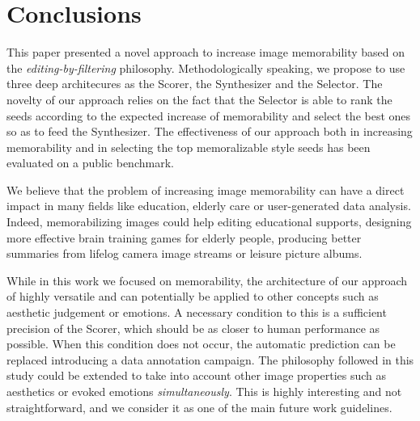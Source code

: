 \documentclass{sig-alternate-05-2015}
\begin{document}
\section{Conclusions}
This paper presented a novel approach to increase image memorability based on the \emph{editing-by-filtering} philosophy. Methodologically speaking, we propose to use three deep architecures as the Scorer, the Synthesizer and the Selector. The novelty of our approach relies on the fact that the Selector is able to rank the seeds according to the expected increase of memorability and select the best ones so as to feed the Synthesizer. The effectiveness of our approach both in increasing memorability and in selecting the top memoralizable style seeds has been evaluated on a public benchmark. %



We believe that the problem of increasing image memorability can have a direct impact in many fields like education, elderly care or user-generated data analysis. Indeed,   memorabilizing images could help editing educational supports, designing more effective brain training games for elderly people, producing better summaries from lifelog camera image streams or leisure picture albums.

While in this work we focused on memorability, the architecture of our approach of highly versatile %
and can potentially be applied to other concepts such as aesthetic judgement or emotions. A necessary condition to this is a sufficient precision of the Scorer, which should be as closer to human performance as possible. When this condition does not occur, the automatic prediction can be replaced introducing a data annotation campaign. %
The philosophy followed in this study could be extended to take into account other image properties such as aesthetics or evoked emotions \textit{simultaneously}. This is highly interesting and not straightforward, and we consider it as one of the main future work guidelines.
\end{document}
